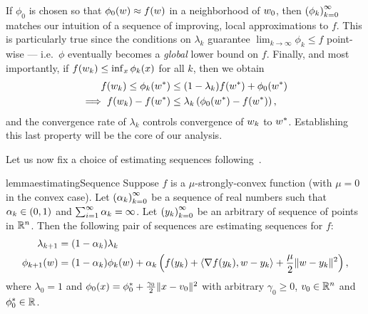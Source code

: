 If \( \phi_0 \) is chosen so that \( \phi_0(w) \approx f(w) \) in a neighborhood of \( w_0 \), then \( \left(\phi_k\right)_{k=0}^\infty \) matches our intuition of a sequence of improving, local approximations to \( f \).
This is particularly true since the conditions on \( \lambda_k \) guarantee \( \lim_{k \rightarrow \infty} \phi_k \leq f \) point-wise --- i.e.\ \( \phi \) eventually becomes a \emph{global} lower bound on \( f \).
Finally, and most importantly, if \( f(w_k) \leq \inf_x \phi_k(x) \) for all \( k \), then we obtain
\begin{align*}
    f(w_k) \leq \phi_k(w^*) &\leq (1 - \lambda_k) f(w^*) + \phi_0(w^*)\\
    \implies f(w_k) - f(w^*) &\leq \lambda_k \left(\phi_0(w^*) - f(w^*)\right),
\end{align*}
and the convergence rate of \( \lambda_k \) controls convergence of \( w_k \) to \( w^* \).
Establishing this last property will be the core of our analysis.

Let us now fix a choice of estimating sequences following~\citet[Lemma 2.2.2]{nesterov2004lectures}. 
\begin{restatable}{lemma}{estimatingSequence}\label{lemma:estimating-sequence}
    Suppose \( f \) is a \( \mu \)-strongly-convex function (with \( \mu = 0 \) in the convex case).
    Let \( \left(\alpha_{k}\right)_{k=0}^\infty \) be a sequence of real numbers such that \( \alpha_{k} \in (0,1) \) and \( \sum_{i=1}^\infty \alpha_{k} = \infty \). 
    Let \( \left(y_k\right)_{k=0}^\infty \) be an arbitrary of sequence of points in \( \mathbb{R}^n \).
    Then the following pair of sequences are estimating sequences for \( f \):
    \begin{align*}
        \lambda_{k+1} &= (1- \alpha_k) \lambda_k\\
        \phi_{k+1}(w) &= (1-\alpha_k) \phi_k(w) + \alpha_k \left(f(y_k) + \left\langle\nabla f(y_k), w - y_k\right\rangle + \frac{\mu}{2} \|w - y_k\|^2\right),
    \end{align*}
    where \( \lambda_0 = 1 \) and \( \phi_0(x) = \phi_0^* + \frac{\gamma_0}{2}\|x - v_0\|^2 \) with arbitrary \( \gamma_0 \geq 0 \), \( v_0 \in \mathbb{R}^n \) and \( \phi_0^* \in \mathbb{R} \).
\end{restatable}

